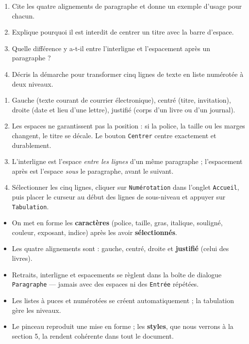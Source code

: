 \documentclass[11pt]{article}
\begin{document}
\begin{exercice}
\begin{enumerate}
\item Cite les quatre alignements de paragraphe et donne un exemple d'usage pour chacun.
\item Explique pourquoi il est interdit de centrer un titre avec la barre d'espace.
\item Quelle différence y a-t-il entre l'interligne et l'espacement après un paragraphe ?
\item Décris la démarche pour transformer cinq lignes de texte en liste numérotée à deux niveaux.
\end{enumerate}
\end{exercice}

\begin{corrige}
\begin{enumerate}
\item Gauche (texte courant de courrier électronique), centré (titre, invitation), droite (date et lieu d'une lettre), justifié (corps d'un livre ou d'un journal).
\item Les espaces ne garantissent pas la position : si la police, la taille ou les marges changent, le titre se décale. Le bouton \texttt{Centrer} centre exactement et durablement.
\item L'interligne est l'espace \emph{entre les lignes} d'un même paragraphe ; l'espacement après est l'espace \emph{sous} le paragraphe, avant le suivant.
\item Sélectionner les cinq lignes, cliquer sur \texttt{Numérotation} dans l'onglet \texttt{Accueil}, puis placer le curseur au début des lignes de sous-niveau et appuyer sur \texttt{Tabulation}.
\end{enumerate}
\end{corrige}

\begin{aretenir}
\begin{itemize}
\item On met en forme les \textbf{caractères} (police, taille, gras, italique, souligné, couleur, exposant, indice) après les avoir \textbf{sélectionnés}.
\item Les quatre alignements sont : gauche, centré, droite et \textbf{justifié} (celui des livres).
\item Retraits, interligne et espacements se règlent dans la boîte de dialogue \texttt{Paragraphe} — jamais avec des espaces ni des \texttt{Entrée} répétées.
\item Les listes à puces et numérotées se créent automatiquement ; la tabulation gère les niveaux.
\item Le pinceau reproduit une mise en forme ; les \textbf{styles}, que nous verrons à la section 5, la rendent cohérente dans tout le document.
\end{itemize}
\end{aretenir}
\end{document}
